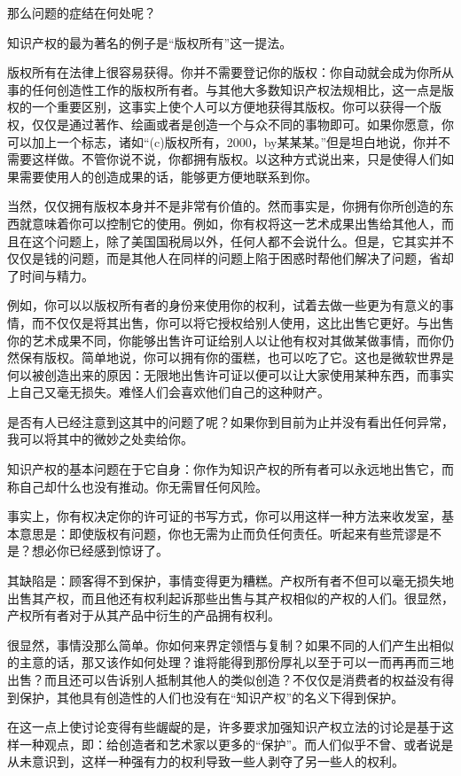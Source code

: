那么问题的症结在何处呢？

知识产权的最为著名的例子是“版权所有”这一提法。

版权所有在法律上很容易获得。你并不需要登记你的版权：你自动就会成为你所从事的任何创造性工作的版权所有者。与其他大多数知识产权法规相比，这一点是版权的一个重要区别，这事实上使个人可以方便地获得其版权。你可以获得一个版权，仅仅是通过著作、绘画或者是创造一个与众不同的事物即可。如果你愿意，你可以加上一个标志，诸如“(c)版权所有，2000，by某某某。”但是坦白地说，你并不需要这样做。不管你说不说，你都拥有版权。以这种方式说出来，只是使得人们如果需要使用人的创造成果的话，能够更方便地联系到你。

当然，仅仅拥有版权本身并不是非常有价值的。然而事实是，你拥有你所创造的东西就意味着你可以控制它的使用。例如，你有权将这一艺术成果出售给其他人，而且在这个问题上，除了美国国税局以外，任何人都不会说什么。但是，它其实并不仅仅是钱的问题，而是其他人在同样的问题上陷于困惑时帮他们解决了问题，省却了时间与精力。

例如，你可以以版权所有者的身份来使用你的权利，试着去做一些更为有意义的事情，而不仅仅是将其出售，你可以将它授权给别人使用，这比出售它更好。与出售你的艺术成果不同，你能够出售许可证给别人以让他有权对其做某做事情，而你仍然保有版权。简单地说，你可以拥有你的蛋糕，也可以吃了它。这也是微软世界是何以被创造出来的原因：无限地出售许可证以便可以让大家使用某种东西，而事实上自己又毫无损失。难怪人们会喜欢他们自己的这种财产。

是否有人已经注意到这其中的问题了呢？如果你到目前为止并没有看出任何异常，我可以将其中的微妙之处卖给你。

知识产权的基本问题在于它自身：你作为知识产权的所有者可以永远地出售它，而称自己却什么也没有推动。你无需冒任何风险。

事实上，你有权决定你的许可证的书写方式，你可以用这样一种方法来收发室，基本意思是：即使版权有问题，你也无需为止而负任何责任。听起来有些荒谬是不是？想必你已经感到惊讶了。

其缺陷是：顾客得不到保护，事情变得更为糟糕。产权所有者不但可以毫无损失地出售其产权，而且他还有权利起诉那些出售与其产权相似的产权的人们。很显然，产权所有者对于从其产品中衍生的产品拥有权利。

很显然，事情没那么简单。你如何来界定领悟与复制？如果不同的人们产生出相似的主意的话，那又该作如何处理？谁将能得到那份厚礼以至于可以一而再再而三地出售？而且还可以告诉别人抵制其他人的类似创造？不仅仅是消费者的权益没有得到保护，其他具有创造性的人们也没有在“知识产权”的名义下得到保护。

在这一点上使讨论变得有些龌龊的是，许多要求加强知识产权立法的讨论是基于这样一种观点，即：给创造者和艺术家以更多的“保护”。而人们似乎不曾、或者说是从未意识到，这样一种强有力的权利导致一些人剥夺了另一些人的权利。

